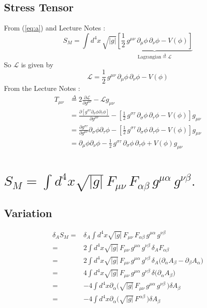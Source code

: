 \documentclass[]{article}
\newcommand{\Lagr}{\mathscr{L}}
\begin{document}
\subsection{Stress Tensor} \label{subseq:StressTensor}
From (\ref{eq:a}) and Lecture Notes \cite[Lecture III, Section 3]{akhmedev2016}:
\begin{equation}
S_M = \int d^4x \, \sqrt{|g|} \underbrace{\left[\frac12 \, g^{\mu\nu} \, \partial_\mu \phi \, \partial_\nu \phi - V(\phi)\right]}_{\text{Lagrangian}\overset{\Delta}{=}\Lagr}
\end{equation}
So $\Lagr$ is given by
\begin{equation}
\Lagr=\frac12 \, g^{\mu\nu} \, \partial_\mu \phi \, \partial_\nu \phi - V(\phi)
\end{equation}
From the Lecture Notes \cite[(64)]{akhmedev2016}:
\begin{align}
T_{\mu\nu}&\overset{\Delta}{=}2 \frac{\partial \Lagr}{\partial g^{\mu\nu}} - \Lagr g_{\mu\nu} \nonumber \\
&=\frac{\partial [g^{\sigma\tau}\partial_\sigma \phi \partial_\tau \phi]}{\partial g^{\mu\nu}}-[\frac12 \, g^{\sigma\tau} \, \partial_\sigma \phi \, \partial_\tau \phi - V(\phi)] g_{\mu\nu} \nonumber \\
&=\frac{\partial g^{\sigma\tau}}{\partial g^{\mu\nu}}\partial_\sigma \phi \partial_\tau \phi-[\frac12 \, g^{\sigma\tau} \, \partial_\sigma \phi \, \partial_\tau \phi - V(\phi)] g_{\mu\nu} \nonumber \\
&=\partial_\mu \phi \partial_\nu \phi - \frac12 \, g^{\sigma\tau} \, \partial_\sigma \phi \, \partial_\tau \phi + V(\phi) g_{\mu\nu} 
\end{align}

\section{$S_M = \int d^4x \sqrt{|g|} \, F_{\mu\nu}\, F_{\alpha\beta} \, g^{\mu\alpha} \, g^{\nu\beta}.$}
\subsection{Variation}
\begin{align*}
\delta_A S_M =& \delta_A \int d^4x \sqrt{|g|} \, F_{\mu\nu}\, F_{\alpha\beta} \, g^{\mu\alpha} \, g^{\nu\beta} \\
=& 2 \int d^4x \sqrt{|g|} \, F_{\mu\nu} \, g^{\mu\alpha} \, g^{\nu\beta} \, \delta_A F_{\alpha\beta}\\
=& 2 \int d^4x \sqrt{|g|} \, F_{\mu\nu} \, g^{\mu\alpha} \, g^{\nu\beta} \, \delta_A \big(\partial_\alpha A_\beta - \partial_\beta A_\alpha\big)\\
=& 4 \int d^4x \sqrt{|g|} \, F_{\mu\nu} \, g^{\mu\alpha} \, g^{\nu\beta} \, \delta \big(\partial_\alpha A_\beta \big)\\
=& -4 \int d^4x \partial_\alpha \big(\sqrt{|g|} \, F_{\mu\nu} \, g^{\mu\alpha} \, g^{\nu\beta} \,\big) \delta A_\beta\\
=& -4 \int d^4x \partial_\alpha \big(\sqrt{|g|} \, F^{\alpha\beta}  \,\big) \delta A_\beta
\end{align*}
\end{document}
